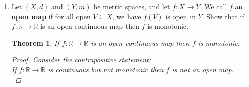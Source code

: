 \documentclass{amsart}
\newtheorem{theorem}{Theorem}
\begin{document}
\begin{enumerate}[1.]
    \newpage
    
    \item Let $(X,d)$ and $(Y,m)$ be metric spaces, and let $f: X \to Y$. We call $f$ an \textbf{open map} if for all open $V \subseteq X$, we have $f(V)$ is open in $Y$. Show that if $f: \mathbb{R} \to \mathbb{R}$ is an open continuous map then $f$ is monotonic.
    \begin{theorem} 
        If $f: \mathbb{R} \to \mathbb{R}$ is an open continuous map then $f$ is monotonic.
        \begin{proof}
            Consider the contrapositive statement: \\

            \emph{If $f: \mathbb{R} \to \mathbb{R}$ is continuous but not monotonic then $f$ is not an open map.} \\


\end{proof}
\end{theorem}
\end{enumerate}
\end{document}
